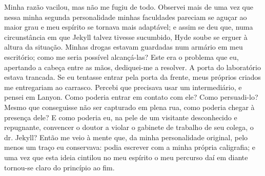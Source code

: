 Minha razão vacilou, mas não me fugiu de todo.  Observei mais de uma vez
que nessa minha segunda personalidade minhas faculdades pareciam se
aguçar ao maior grau e meu espírito se tornava mais adaptável; e assim
se deu que, numa circunstância em que Jekyll talvez tivesse sucumbido,
Hyde soube se erguer à altura da situação.  Minhas drogas estavam
guardadas num armário em meu escritório; como me seria possível
alcançá-las?  Este era o problema que eu, apertando a cabeça entre as
mãos, dediquei-me a resolver.  A porta do laboratório estava trancada. 
Se eu tentasse entrar pela porta da frente, meus próprios criados me
entregariam ao carrasco.  Percebi que precisava usar um intermediário,
e pensei em Lanyon.  Como poderia entrar em contato com ele?  Como
persuadi-lo?  Mesmo que conseguisse não ser capturado em plena rua,
como poderia chegar à presença dele?  E como poderia eu, na pele de um
visitante desconhecido e repugnante, convencer o doutor a violar o
gabinete de trabalho de seu colega, o dr. Jekyll?  Então me veio à
mente que, da minha personalidade original, pelo menos um traço eu
conservava: podia escrever com a minha própria caligrafia; e uma vez
que esta ideia cintilou no meu espírito o meu percurso daí em diante
tornou-se claro do princípio ao fim. 

